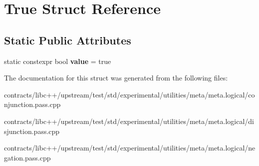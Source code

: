 \hypertarget{struct_true}{}\section{True Struct Reference}
\label{struct_true}
\subsection*{Static Public Attributes}
\begin{DoxyCompactItemize}
\item 
\mbox{\label{struct_true_a6fbca76e62f41d5fba2366141181abb6}} 
static constexpr bool {\bfseries value} = true
\end{DoxyCompactItemize}


The documentation for this struct was generated from the following files\+:\begin{DoxyCompactItemize}
\item 
contracts/libc++/upstream/test/std/experimental/utilities/meta/meta.\+logical/conjunction.\+pass.\+cpp\item 
contracts/libc++/upstream/test/std/experimental/utilities/meta/meta.\+logical/disjunction.\+pass.\+cpp\item 
contracts/libc++/upstream/test/std/experimental/utilities/meta/meta.\+logical/negation.\+pass.\+cpp\end{DoxyCompactItemize}

